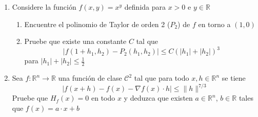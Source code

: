 \documentclass[letterpaper,11pt]{article}
\newcommand{\norm}[1]{\lVert #1\rVert }
\begin{document}
\begin{enumerate}
\item Considere la función $f(x,y)=x^y$ definida para $x>0$ e $y\in\mathbb{R}$
\begin{enumerate}
    \item Encuentre el polinomio de Taylor de orden 2 ($P_2$) de $f$ en torno a $(1,0)$
    \item Pruebe que existe una constante $C$ tal que
    \[|f(1+h_1,h_2)-P_2(h_1,h_2)|\leq C (|h_1|+|h_2|)^3\]
    para $|h_1|+|h_2|\leq \frac{1}{2}$
\end{enumerate}
\item Sea $f:\mathbb{R}^n\rightarrow\mathbb{R}$ una función de clase $\mathcal{C}^2$ tal que para todo $x,h \in \mathbb{R}^n$ se tiene
\[|f(x+h)-f(x)-\nabla f(x)\cdot h|\leq \norm{h}^{7/3}\]
Pruebe que $H_f(x)=0$ en todo $x$ y deduzca que existen $a\in\mathbb{R}^n$, $b\in\mathbb{R}$ tales que $f(x)=a\cdot x+b$
\end{enumerate}
\end{document}
